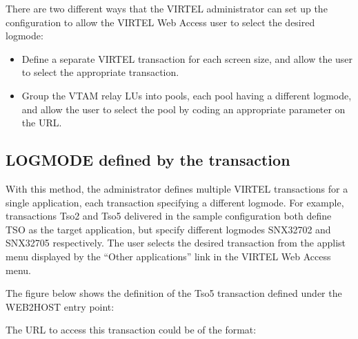 \documentclass[letterpaper,10pt,english]{sphinxmanual}
\begin{document}
There are two different ways that the VIRTEL administrator can set up the configuration to allow the VIRTEL Web Access user to select the desired logmode:
\begin{itemize}
\item {} 
Define a separate VIRTEL transaction for each screen size, and allow the user to select the appropriate transaction.

\item {} 
Group the VTAM relay LUs into pools, each pool having a different logmode, and allow the user to select the pool by coding an appropriate parameter on the URL.

\end{itemize}

\ignorespaces 

\subsection{LOGMODE defined by the transaction}
\label{\detokenize{Customization:logmode-defined-by-the-transaction}}\label{\detokenize{Customization:index-67}}
With this method, the administrator defines multiple VIRTEL transactions for a single application, each transaction specifying a different logmode. For example, transactions Tso2 and Tso5 delivered in the sample configuration both define TSO as the target application, but specify different logmodes SNX32702 and SNX32705 respectively. The user selects the desired transaction from the applist menu displayed by the “Other applications” link in the VIRTEL Web Access menu.

The figure below shows the definition of the Tso5 transaction defined under the WEB2HOST entry point:



The URL to access this transaction could be of the format:

\begin{sphinxVerbatim}[commandchars=\\\{\}]
\end{sphinxVerbatim}
\end{document}
